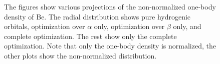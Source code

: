 \documentclass[aps,prc,twocolumn,floatfix]{revtex4}
\begin{document}
\begin{figure}[ht]
\caption[Optional caption for list of figures]{The figures show various projections of the non-normalized one-body density of Be. The radial distribution shows pure hydrogenic orbitals, optimization over $\alpha$ only, optimization over $\beta$ only, and complete optimization. The rest show only the complete optimization. Note that only the one-body density is normalized, the other plots show the non-normalized distribution.}
\label{fig:7}
\end{figure}
\end{document}
